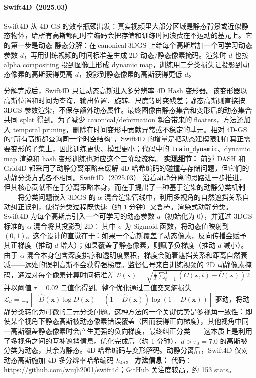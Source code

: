 \paragraph{Swift4D（2025.03）\cite{2503_12307}}
Swift4D 从 4D-GS 的效率瓶颈出发：真实视频里大部分区域是静态背景或近似静态物体，给所有高斯都配时空编码会把存储和训练时间浪费在不运动的基元上。它的第一步是动态-静态分解：在 canonical 3DGS 上给每个高斯增加一个可学习动态参数 $d$，再用训练视频的时间标准差生成 2D 动态/静态像素掩码。渲染时 $d$ 也按 alpha compositing 投到图像上形成 dynamic map，训练用二分类损失让投影到动态像素的高斯获得更高 $d$，投影到静态像素的高斯获得更低 $d$。

分解完成后，Swift4D 只让动态高斯进入多分辨率 4D Hash 变形器。该变形器以高斯位置和时间为查询，输出位置、旋转、尺度等时变残差；静态高斯则直接按 3DGS 参数渲染，不保存额外动态属性。最终图像由静态集合和变形后的动态集合共同 splat 得到。为了减少 canonical/deformation 耦合带来的 floaters，方法还加入 temporal pruning，删除在时间变形中贡献异常或不稳定的基元。相对 4D-GS 的“所有高斯都查询同一个时空结构”，Swift4D 的增量是把动态建模限制在真正需要变形的子集上，因此训练更快、模型更小；代码中的 \texttt{train\_dynamic}、dynamic map 渲染和 hash 变形训练也对应这个三阶段流程。
\textbf{实现细节：} 前述 DASH 和 Grid4D 都采用了动静分离策略来缓解 4D 哈希编码的碰撞与存储问题，但它们的动静分类方式各不相同。Swift4D（2025.03） 沿着动静分离的思路进一步推进，但其核心贡献不在于分离策略本身，而在于提出了一种基于渲染的动静分类机制——将分类问题嵌入 3DGS 的 $\alpha$-混合渲染管线中，利用多视角的自然遮挡关系自动纠正误判，使得分类过程既快速（约 1 分钟）又鲁棒。渲染式动静分类。Swift4D 为每个高斯点引入一个可学习的动态参数 $d$（初始化为 0），并通过 3DGS 标准的 $\alpha$-混合将其投影到 2D： 其中 $\sigma$ 为 Sigmoid 函数，将动态值映射到 $(0,1)$。这个设计的直觉在于：如果一个高斯覆盖了动态像素，反向传播会赋予其正梯度（推动 $d$ 增大）；如果覆盖了静态像素，则赋予负梯度（推动 $d$ 减小）。由于 $\alpha$-混合本身包含深度排序和透明度累积，梯度会随着遮挡关系和距离自然衰减——远处的误判高斯不会获得强梯度。监督信号来自训练视频的 2D 动静像素掩码，通过对每个像素计算时间标准差 $S(\mathbf{x}) = \sqrt{\frac{1}{T}\sum_{t=1}^{T}(C(\mathbf{x},t) - \bar{C}(\mathbf{x}))^{}2}$ 并以阈值 $\tau = 0.02$ 二值化得到。整个优化通过二值交叉熵损失 $\mathcal{L}_d = \mathbb{E}_\mathbf{x}[-\hat{D}(\mathbf{x})\log D(\mathbf{x}) - (1-\hat{D}(\mathbf{x}))\log(1-D(\mathbf{x}))]$ 驱动，将动静分类转化为可微的二元分类问题。这种方法的一个关键优势是多视角一致性：即使某个视角下静态高斯被动态像素错误覆盖（因而获得正向梯度），其他视角中同一高斯覆盖静态像素时会产生更强的负向梯度，最终纠正分类——这本质上是利用了多视角之间的互补遮挡信息。优化完成后（约 1 分钟），$d > \tau_d = 7.0$ 的高斯被分类为动态，其余为静态。4D 哈希编码与变形解码。动静分离后，Swift4D 仅对动态高斯施加 4D 多分辨率哈希编码 $h_{4d}$。
\textbf{方法信息：} 代码：\url{https://github.com/wujh2001/swift4d}；GitHub 关注度较高，约 153 stars。



